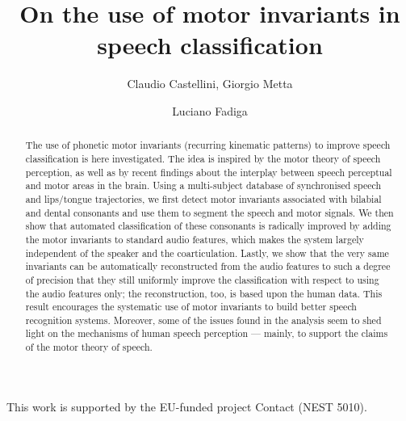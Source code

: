 \documentclass{pnastwo}
\begin{document}
\title{On the use of motor invariants in speech classification}

\author{
Claudio Castellini,
Giorgio Metta \and
Luciano Fadiga
}


\maketitle

\begin{article}

\begin{abstract}

  The use of phonetic motor invariants (recurring kinematic patterns)
  to improve speech classification is here investigated. The
  idea is inspired by the motor theory of speech perception, as well as
  by recent findings about the interplay between speech
  perceptual and motor areas in the brain. Using a multi-subject database
  of synchronised speech and lips/tongue trajectories, we first detect
  motor invariants associated with bilabial and dental consonants
  and use them to segment the speech and motor signals.
  We then show that automated classification of these
  consonants is radically improved by adding the motor invariants to
  standard audio features, which makes the system largely independent
  of the speaker and the coarticulation.
  Lastly, we show that the very same invariants can be
  automatically reconstructed from the audio features to such a degree of
  precision that they still uniformly improve the classification with
  respect to using the audio features only; the
  reconstruction, too, is based upon the human data.
  This result encourages the systematic use of motor invariants to build
  better speech recognition systems. Moreover, some of the issues found in
  the analysis seem to shed light on the mechanisms of human speech perception
  --- mainly, to support the claims of the motor theory of speech.
  
\end{abstract}










\begin{acknowledgments}
  This work is supported by the EU-funded project Contact (NEST 5010).
\end{acknowledgments}

%

\end{article}
\end{document}
